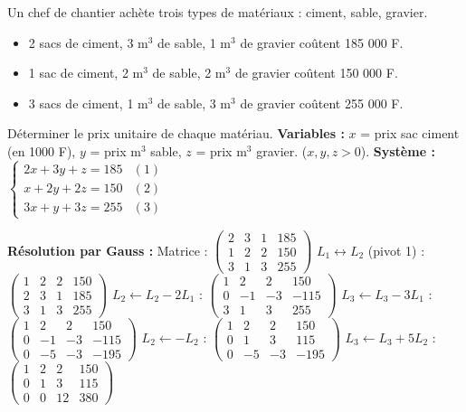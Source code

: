 \documentclass[11pt]{article}
\begin{document}
\begin{exoresolu}
Un chef de chantier achète trois types de matériaux : ciment, sable, gravier.
\begin{itemize}
  \item 2 sacs de ciment, 3 m$^3$ de sable, 1 m$^3$ de gravier coûtent 185 000 F.
  \item 1 sac de ciment, 2 m$^3$ de sable, 2 m$^3$ de gravier coûtent 150 000 F.
  \item 3 sacs de ciment, 1 m$^3$ de sable, 3 m$^3$ de gravier coûtent 255 000 F.
\end{itemize}
Déterminer le prix unitaire de chaque matériau.
\tcblower
\textbf{Variables :} $x$ = prix sac ciment (en 1000 F), $y$ = prix m$^3$ sable, $z$ = prix m$^3$ gravier. ($x,y,z > 0$).
\textbf{Système :}
$\begin{cases}
2x + 3y + z = 185 & (1)\\
x + 2y + 2z = 150 & (2)\\
3x + y + 3z = 255 & (3)
\end{cases}$

\textbf{Résolution par Gauss :}
Matrice : $\left( \begin{array}{ccc|c} 2 & 3 & 1 & 185 \\ 1 & 2 & 2 & 150 \\ 3 & 1 & 3 & 255 \end{array} \right)$
$L_1 \leftrightarrow L_2$ (pivot 1) : $\left( \begin{array}{ccc|c} 1 & 2 & 2 & 150 \\ 2 & 3 & 1 & 185 \\ 3 & 1 & 3 & 255 \end{array} \right)$
$L_2 \leftarrow L_2 - 2L_1$ : $\left( \begin{array}{ccc|c} 1 & 2 & 2 & 150 \\ 0 & -1 & -3 & -115 \\ 3 & 1 & 3 & 255 \end{array} \right)$
$L_3 \leftarrow L_3 - 3L_1$ : $\left( \begin{array}{ccc|c} 1 & 2 & 2 & 150 \\ 0 & -1 & -3 & -115 \\ 0 & -5 & -3 & -195 \end{array} \right)$
$L_2 \leftarrow -L_2$ : $\left( \begin{array}{ccc|c} 1 & 2 & 2 & 150 \\ 0 & 1 & 3 & 115 \\ 0 & -5 & -3 & -195 \end{array} \right)$
$L_3 \leftarrow L_3 + 5L_2$ : $\left( \begin{array}{ccc|c} 1 & 2 & 2 & 150 \\ 0 & 1 & 3 & 115 \\ 0 & 0 & 12 & 380 \end{array} \right)$


\end{exoresolu}
\end{document}
